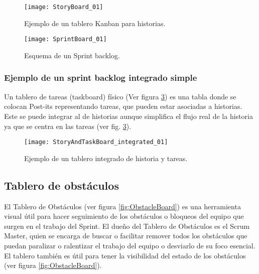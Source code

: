\begin{figure}[h]
  \centering
  \texttt{[image: StoryBoard\_01]}
  \caption{Ejemplo de un tablero Kanban para historias.}
  \centering
  \label{fig:StoryBoard_01} %
\end{figure}
\FloatBarrier %

\begin{figure}[h]
  \centering
  \texttt{[image: SprintBoard\_01]}
  \caption{Esquema de un Sprint backlog.}
  \centering
  \label{fig:SprintBoard_01} %
\end{figure}
\FloatBarrier %

\subsubsection{Ejemplo de un sprint backlog integrado simple}

Un tablero de tareas (taskboard) físico (Ver figura \ref{fig:StoryAndTaskBoard_integrated_01}) es una tabla donde se colocan Post-its representando tareas, que pueden estar asociadas a historias. Este se puede integrar al de historias aunque simplifica el flujo real de la historia ya que se centra en las tareas (ver fig. \ref{fig:StoryAndTaskBoard_integrated_01}).

\begin{figure}[h]
  \centering
  \texttt{[image: StoryAndTaskBoard\_integrated\_01]}
  \caption{Ejemplo de un tablero integrado de historia y tareas.}
  \centering
  \label{fig:StoryAndTaskBoard_integrated_01} %
\end{figure}

\subsection{Tablero de obstáculos}

El Tablero de Obstáculos (ver figura \ref{fig:ObstacleBoard}) es una herramienta visual útil para hacer seguimiento de los obstáculos o bloqueos del equipo que surgen en el trabajo del Sprint. El dueño del Tablero de Obstáculos es el Scrum Master, quien se encarga de buscar o facilitar remover todos los obstáculos que puedan paralizar o ralentizar el trabajo del equipo o desviarlo de su foco esencial. El tablero también es útil para tener la visibilidad del estado de los obstáculos (ver figura \ref{fig:ObstacleBoard}).

